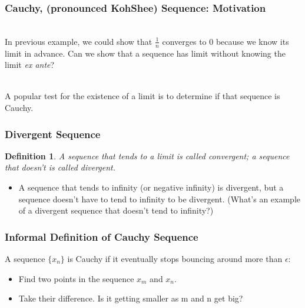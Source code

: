 \documentclass{beamer}
\newtheorem{defn}{Definition}
\numberwithin{equation}{section}
\begin{document}
\begin{frame}
\frametitle{Cauchy, (pronounced KohShee) Sequence: Motivation}


\ \\In previous example, we could show that $\frac{1}{n}$ converges to 0 because we know its limit in advance. Can we show that a sequence has limit without knowing the limit \emph{ex ante}?\pause

\ \\A popular test for the existence of a limit is to determine if that sequence is Cauchy.



\end{frame}




\begin{frame}
\frametitle{Divergent Sequence}

\begin{defn}
A sequence that tends to a limit is called convergent; a sequence that doesn't is called divergent.
\end{defn} \pause

\begin{itemize}
\item A sequence that tends to infinity (or negative infinity) is divergent, but a sequence doesn't have to tend to infinity to be divergent. \pause (What's an example of a divergent sequence that doesn't tend to infinity?)
\end{itemize}

\end{frame}


\begin{frame}
\frametitle{Informal Definition of Cauchy Sequence}

A sequence  $\{x_{n} \}$ is Cauchy if it eventually stops bouncing around more than $\epsilon$:

\begin{itemize}
\item Find two points in the sequence $x_m$ and $x_n$.
\item Take their difference.  Is it getting smaller as m and n get big?
\end{itemize}


\end{frame}
\end{document}
